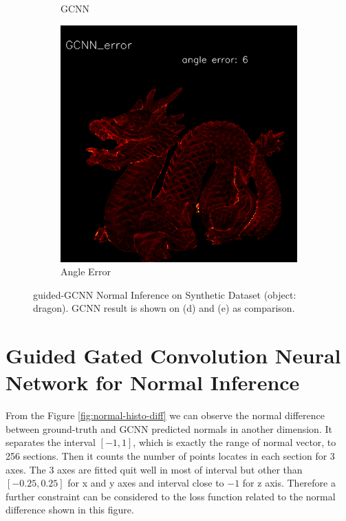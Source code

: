 \begin{figure}[h!]
\begin{subfigure}[b]{0.19\linewidth}
		\caption{GCNN}
	\end{subfigure}
	\begin{subfigure}[b]{0.19\linewidth}
		\includegraphics[width=\linewidth]{./Figures/gcnn-synthetic/fancy_eval_3_error_GCNN.png}
		\caption{Angle Error}
	\end{subfigure}
	\caption{guided-GCNN Normal Inference on Synthetic Dataset (object: dragon). GCNN result is shown on (d) and (e) as comparison.}
	\label{fig:ng-eval-synthetic}
\end{figure}



\section{Guided Gated Convolution Neural Network for Normal Inference }

From the Figure \ref{fig:normal-histo-diff} we can observe the normal difference between ground-truth and GCNN predicted normals in another dimension. It separates the interval $ \left[ -1,1 \right] $, which is exactly the range of normal vector, to 256 sections. Then it counts the number of points locates in each section for 3 axes.  The 3 axes are fitted quit well in most of interval but other than $ \left[ -0.25,0.25 \right] $ for x and y axes and  interval close to $ -1 $ for z axis. Therefore a further constraint can be considered to the loss function related to the normal difference shown in this figure.

